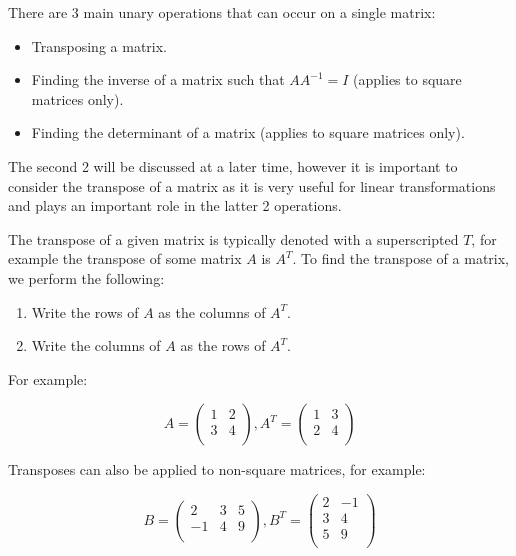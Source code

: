 \documentclass[a4paper,oneside]{report}
\begin{document}
There are 3 main unary operations that can occur on a single matrix:

\begin{itemize}
	\item{Transposing a matrix.}
	\item{Finding the inverse of a matrix such that \( AA^{-1} = I \)
		(applies to square matrices only).}
	\item{Finding the determinant of a matrix (applies to square matrices
		only).}
\end{itemize}

The second 2 will be discussed at a later time, however it is important to
consider the transpose of a matrix as it is very useful for linear
transformations and plays an important role in the latter 2 operations.

The transpose of a given matrix is typically denoted with a superscripted
\( T \), for example the transpose of some matrix \( A \) is \( A^T \). To find
the transpose of a matrix, we perform the following:

\begin{enumerate}
	\item{Write the rows of \( A \) as the columns of \( A^T \).}
	\item{Write the columns of \( A \) as the rows of \( A^T \).}
\end{enumerate}

For example:

\[ A = \begin{pmatrix}
	1 & 2 \\
	3 & 4 \\
\end{pmatrix}, A^T = \begin{pmatrix}
	1 & 3 \\
	2 & 4 \\
\end{pmatrix} \]

Transposes can also be applied to non-square matrices, for example:

\[ B = \begin{pmatrix}
	2 & 3 & 5 \\
	-1 & 4 & 9 \\
\end{pmatrix}, B^T = \begin{pmatrix}
	2 & -1 \\
	3 & 4 \\
	5 & 9 \\
\end{pmatrix} \]
\end{document}
